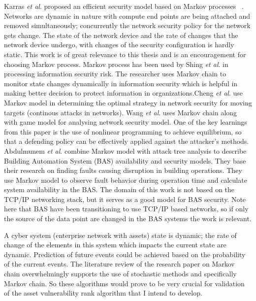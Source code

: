 Karras \textit{et al}. proposed an efficient security model based on Markov processes ~\cite{4689126}. Networks are dynamic in nature with compute end points are being attached and removed simultaneously; concurrently the network security policy for the network gets change. The state of the network device and the rate of changes that the network device undergo, with changes of the security configuration is hardly static. This work is of great relevance to this thesis and is an encouragement for choosing Markov process. Markov process has been used by Shing \textit{et al}. in processing information security risk. The researcher uses Markov chain to monitor state changes dynamically in information security which is helpful in making better decision to protect information in organizations.Cheng \textit{et al}. use Markov model in determining the optimal strategy in network security for moving targets (continous attacks in networks). Wang \textit{et al}. uses Markov chain along with game model for analysing network security model. One of the key learnings from this paper is the use of nonlinear programming to achieve equilibrium, so that a defending policy can be effectively applied against the attacker's methods. Abdulmunem \textit{et al}. combine Markov model with attack tree analysis to describe Building Automation System (BAS) availability and security models. They base their research on finding faults causing disruption in building operations. They use Markov model to observe fault behavior during operation time and calculate system availability in the BAS. The domain of this work is not based on the TCP/IP networking stack, but it serves as a good model for BAS security. Note here that BAS have been transitioning to use TCP/IP based networks, so if only the source of the data point are changed in the BAS systems the work is relevant.

A cyber system (enterprise network with assets) state is dynamic; the rate of change of the elements in this system which impacts the current state are dynamic. Prediction of future events could be achieved based on the probability of the current events. The literature review of the research paper on Markov chain overwhelmingly supports the use of stochastic methods and specifically Markov chain. So these algorithms would prove to be very crucial for validation of the asset vulnerability rank algorithm that I intend to develop.

